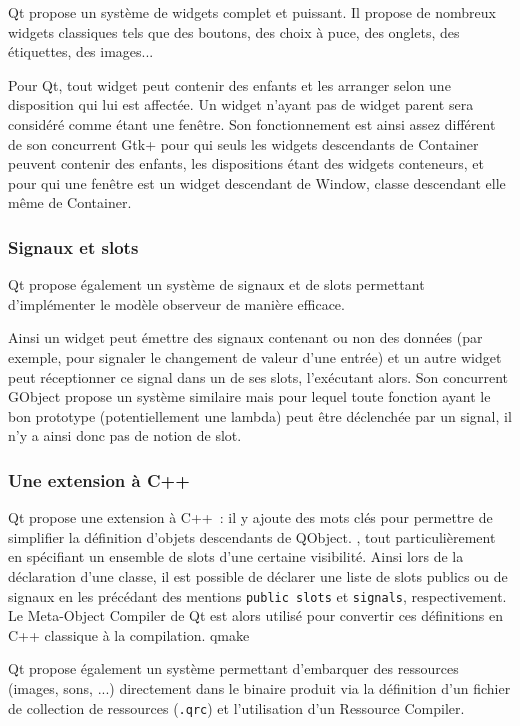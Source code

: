 Qt propose un système de widgets complet et puissant. Il propose de nombreux widgets classiques tels que des boutons, des choix à puce, des onglets, des étiquettes, des images...

Pour Qt, tout widget peut contenir des enfants et les arranger selon une disposition qui lui est affectée. Un widget n'ayant pas de widget parent sera considéré comme étant une fenêtre.
Son fonctionnement est ainsi assez différent de son concurrent Gtk+ pour qui seuls les widgets descendants de Container peuvent contenir des enfants, les dispositions étant des widgets conteneurs, et pour qui une fenêtre est un widget descendant de Window, classe descendant elle même de Container.

\subsubsection{Signaux et slots}

Qt propose également un système de signaux et de slots permettant d'implémenter le modèle observeur de manière efficace.%

Ainsi un widget peut émettre des signaux contenant ou non des données (par exemple, pour signaler le changement de valeur d'une entrée) et un autre widget peut réceptionner ce signal dans un de ses slots, l'exécutant alors.
Son concurrent GObject propose un système similaire mais pour lequel toute fonction ayant le bon prototype (potentiellement une lambda) peut être déclenchée par un signal, il n'y a ainsi donc pas de notion de slot.

\subsubsection{Une extension à C++}

Qt propose une extension à C++~: il y ajoute des mots clés pour permettre de simplifier la définition d'objets descendants de QObject.
, tout particulièrement en spécifiant un ensemble de slots d'une certaine visibilité.
Ainsi lors de la déclaration d'une classe, il est possible de déclarer une liste de slots publics ou de signaux en les précédant des mentions \verb|public slots| et \verb|signals|, respectivement.
Le Meta-Object Compiler de Qt est alors utilisé pour convertir ces définitions en C++ classique à la compilation.
qmake

Qt propose également un système permettant d'embarquer des ressources (images, sons, ...) directement dans le binaire produit via la définition d'un fichier de collection de ressources (\verb|.qrc|) et l'utilisation d'un Ressource Compiler.

